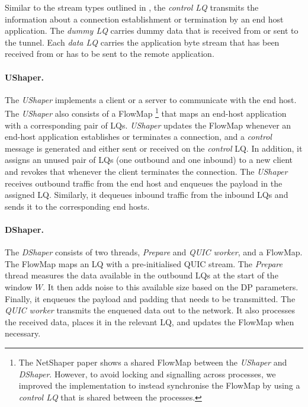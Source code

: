 Similar to the stream types outlined in , the \textit{control LQ} transmits the information about a connection establishment or termination by an end host application. 
The \textit{dummy LQ} carries dummy data that is received from or sent to the tunnel.
Each \textit{data LQ} carries the application byte stream that has been received from or has to be sent to the remote application.


\paragraph{UShaper.}
The \textit{UShaper} implements a client or a server to communicate with the end host.
The \textit{UShaper} also consists of a FlowMap 
\footnote{The NetShaper paper shows a shared FlowMap between the \textit{UShaper} and \textit{DShaper}. However, to avoid locking and signalling across processes, we improved the implementation to instead synchronise the FlowMap by using a \textit{control LQ} that is shared between the processes.}
that maps an end-host application with a corresponding pair of LQs.
\textit{UShaper} updates the FlowMap whenever an end-host application establishes or terminates a connection, and a \textit{control} message is generated and either sent or received on the \textit{control} LQ.
In addition, it assigns an unused pair of LQs (one outbound and one inbound) to a new client and revokes that whenever the client terminates the connection.
The \textit{UShaper} receives outbound traffic from the end host and enqueues the payload in the assigned LQ.
Similarly, it dequeues inbound traffic from the inbound LQs and sends it to the corresponding end hosts.

\paragraph{DShaper.}
The \textit{DShaper} consists of two threads, \textit{Prepare} and \textit{QUIC worker}, and a FlowMap.
The FlowMap maps an LQ with a pre-initialised QUIC stream.
The \textit{Prepare} thread measures the data available in the outbound LQs at the start of the window $W$.
It then adds noise to this available size based on the DP parameters.
Finally, it enqueues the payload and padding that needs to be transmitted.
The \textit{QUIC worker} transmits the enqueued data out to the network.
It also processes the received data, places it in the relevant LQ, and updates the FlowMap when necessary.

